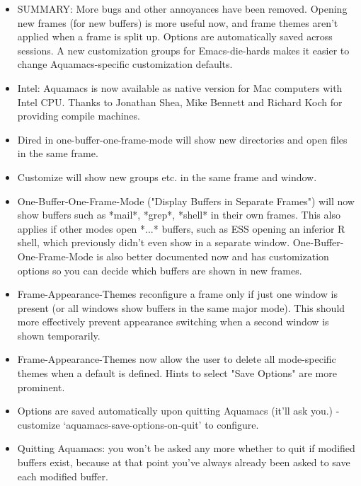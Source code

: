\begin{itemize}

\item  SUMMARY: More bugs and other annoyances
        have been removed. Opening new frames (for new buffers) is more
        useful now, and frame themes aren't applied when a frame is split
        up. Options are automatically saved across sessions. A new
        customization groups for Emacs-die-hards makes it easier to change
        Aquamacs-specific customization defaults.

\item  Intel: Aquamacs is now available as native version for Mac
        computers with Intel CPU.  Thanks to Jonathan Shea, Mike Bennett
        and Richard Koch for providing compile machines.

\item  Dired in one-buffer-one-frame-mode will show new
        directories and open files in the same frame.

\item  Customize will show new groups etc. in the same frame and window.

\item  One-Buffer-One-Frame-Mode ("Display Buffers in Separate Frames")
        will now show buffers such as *mail*, *grep*, *shell* in their own
        frames. This also applies if other modes open *...* buffers, such
        as ESS opening an inferior R shell, which previously didn't even
        show in a separate window. One-Buffer-One-Frame-Mode is also better
        documented now and has customization options so you can decide
        which buffers are shown in new frames.

\item  Frame-Appearance-Themes reconfigure a frame only if just one
        window is present (or all windows show buffers in the same major
        mode). This should more effectively prevent appearance switching
        when a second window is shown temporarily.

\item  Frame-Appearance-Themes now allow the user to delete all
        mode-specific themes when a default is defined. Hints to select
        "Save Options" are more prominent.

\item  Options are saved automatically upon quitting Aquamacs (it'll
        ask you.) - customize `aquamacs-save-options-on-quit' to
        configure.

\item  Quitting Aquamacs: you won't be asked any more whether to quit
        if modified buffers exist, because at that point you've always already
        been asked to save each modified buffer.


\end{itemize}

